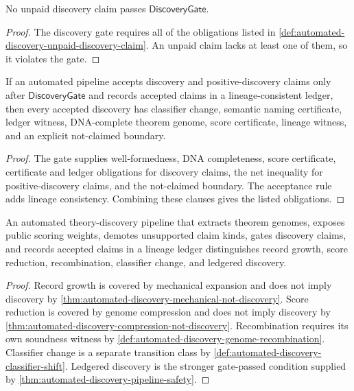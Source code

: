 \begin{theorem}
\label{thm:automated-discovery-no-unpaid-discovery}
No unpaid discovery claim passes $\mathsf{DiscoveryGate}$.
\end{theorem}
\begin{proof}
The discovery gate requires all of the obligations listed in
\autoref{def:automated-discovery-unpaid-discovery-claim}. An unpaid claim
lacks at least one of them, so it violates the gate.
\end{proof}

\begin{theorem}
\label{thm:automated-discovery-pipeline-safety}
If an automated pipeline accepts discovery and positive-discovery claims only
after $\mathsf{DiscoveryGate}$ and records accepted claims in a
lineage-consistent ledger, then every accepted discovery has classifier change,
semantic naming certificate, ledger witness, DNA-complete theorem genome, score
certificate, lineage witness, and an explicit not-claimed boundary.
\end{theorem}
\begin{proof}
The gate supplies well-formedness, DNA completeness, score certificate,
certificate and ledger obligations for discovery claims, the net inequality for
positive-discovery claims, and the not-claimed boundary. The acceptance rule
adds lineage consistency. Combining these clauses gives the listed
obligations.
\end{proof}

\begin{theorem}
\label{thm:automated-discovery-pipeline-theorem}
An automated theory-discovery pipeline that extracts theorem genomes, exposes
public scoring weights, demotes unsupported claim kinds, gates discovery
claims, and records accepted claims in a lineage ledger distinguishes record
growth, score reduction, recombination, classifier change, and ledgered
discovery.
\end{theorem}
\begin{proof}
Record growth is covered by mechanical expansion and does not imply discovery
by \autoref{thm:automated-discovery-mechanical-not-discovery}. Score reduction
is covered by genome compression and does not imply discovery by
\autoref{thm:automated-discovery-compression-not-discovery}. Recombination
requires its own soundness witness by
\autoref{def:automated-discovery-genome-recombination}. Classifier change is a
separate transition class by
\autoref{def:automated-discovery-classifier-shift}. Ledgered discovery is the
stronger gate-passed condition supplied by
\autoref{thm:automated-discovery-pipeline-safety}.
\end{proof}

